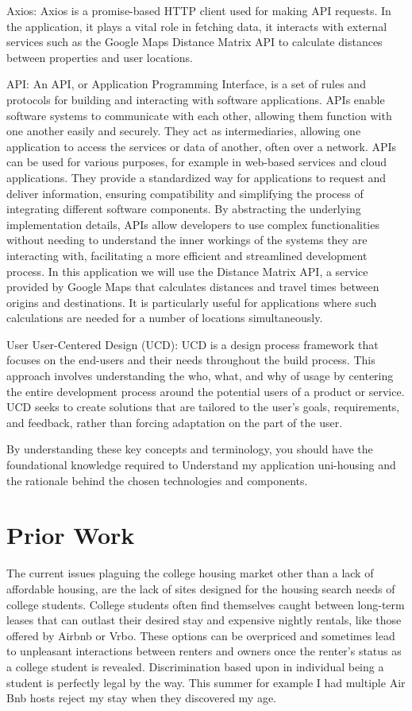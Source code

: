 \documentclass[10pt,twocolumn]{article}
\begin{document}
\noindent Axios: Axios is a promise-based HTTP client used for making API requests. In the application, it plays a vital role in fetching data, it interacts with external services such as the Google Maps Distance Matrix API to calculate distances between properties and user locations.

\noindent API: An API, or Application Programming Interface, is a set of rules and protocols for building and interacting with software applications. APIs enable software systems to communicate with each other, allowing them function with one another easily and securely. They act as intermediaries, allowing one application to access the services or data of another, often over a network. APIs can be used for various purposes, for example in web-based services and cloud applications. They provide a standardized way for applications to request and deliver information, ensuring compatibility and simplifying the process of integrating different software components. By abstracting the underlying implementation details, APIs allow developers to use complex functionalities without needing to understand the inner workings of the systems they are interacting with, facilitating a more efficient and streamlined development process. In this application we will use the Distance Matrix API, a service provided by Google Maps that calculates distances and travel times between origins and destinations. It is particularly useful for applications where such calculations are needed for a number of locations simultaneously.

\noindent User User-Centered Design (UCD): UCD is a design process framework that focuses on the end-users and their needs throughout the build process. This approach involves understanding the who, what, and why of usage by centering the entire development process around the potential users of a product or service. UCD seeks to create solutions that are tailored to the user's goals, requirements, and feedback, rather than forcing adaptation on the part of the user. 

By understanding these key concepts and terminology, you should have the foundational knowledge required to Understand my application uni-housing and the rationale behind the chosen technologies and components.

\section{Prior Work}

The current issues plaguing the college housing market other than a lack of affordable housing, are the lack of sites designed for the housing search needs of college students. College students often find themselves caught between long-term leases that can outlast their desired stay and expensive nightly rentals, like those offered by Airbnb or Vrbo. These options can be overpriced and sometimes lead to unpleasant interactions between renters and owners once the renter's status as a college student is revealed. Discrimination based upon in individual being a student is perfectly legal by the way. \cite{Boston.com} This summer for example I had multiple Air Bnb hosts reject my stay when they discovered my age. 
\end{document}
